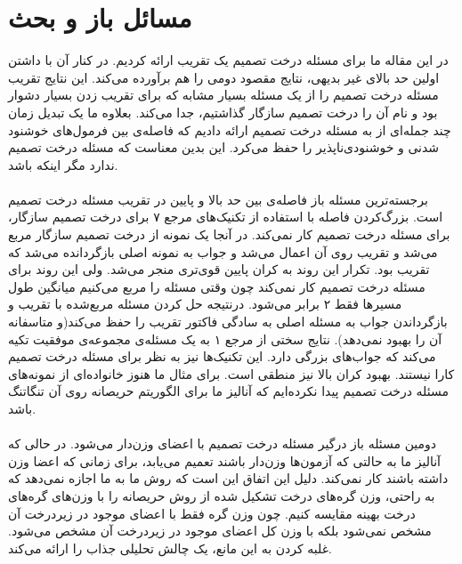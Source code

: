 \documentclass[a4paper]{article}
\begin{document}
 	\section{مسائل باز و بحث}
 	در این مقاله ما برای مسئله درخت تصمیم یک تقریب
 	ارائه کردیم. در کنار آن با داشتن اولین حد بالای غیر بدیهی، نتایج مقصود دومی را هم برآورده می‌کند. این نتایج
 	تقریب مسئله درخت تصمیم را از یک مسئله بسیار مشابه که برای تقریب زدن بسیار دشوار بود و نام آن را درخت تصمیم
 	سازگار گذاشتیم، جدا می‌کند. بعلاوه ما یک تبدیل زمان چند جمله‌ای از 
 	به مسئله درخت تصمیم ارائه دادیم که فاصله‌ی 
 	\lr{$\epsilon$}
 	بین فرمول‌های خوشنود شدنی و خوشنودی‌ناپذیر را حفظ می‌کرد. این بدین معناست که مسئله درخت تصمیم
 	ندارد مگر اینکه
 	باشد.
 	\paragraph{}
 	برجسته‌ترین مسئله باز فاصله‌ی بین حد بالا و پایین در تقریب مسئله درخت تصمیم است. بزرگ‌کردن فاصله با استفاده از
 	تکنیک‌های مرجع ۷ برای درخت تصمیم سازگار، برای مسئله درخت تصمیم کار نمی‌کند. در آنجا یک نمونه از
 	درخت تصمیم سازگار مربع می‌شد و تقریب
 	\lr{$\alpha$}
 	روی آن اعمال می‌شد و جواب به نمونه اصلی بازگردانده می‌شد که تقریب
 	\lr{$\sqrt{\alpha}$}
 	بود. تکرار این روند به کران پایین قوی‌تری منجر می‌شد. ولی این روند برای مسئله درخت تصمیم کار نمی‌کند چون وقتی 
 	مسئله را مربع می‌کنیم میانگین طول مسیرها فقط ۲ برابر می‌شود. درنتیجه حل کردن مسئله مربع‌شده با تقریب
 	\lr{$\alpha$}
 	و بازگرداندن جواب به مسئله اصلی به سادگی فاکتور تقریب را حفظ می‌کند(و متاسفانه آن را بهبود نمی‌دهد).
 	نتایج سختی از مرجع ۱ به یک مسئله‌ی مجموعه‌ی موفقیت تکیه می‌کند که جواب‌های بزرگی دارد. این تکنیک‌ها نیز به نظر برای مسئله درخت تصمیم کارا نیستند. بهبود کران بالا نیز منطقی است. برای مثال ما هنوز خانواده‌ای از نمونه‌های مسئله
 	درخت تصمیم پیدا نکرده‌ایم که آنالیز ما برای الگوریتم حریصانه روی آن تنگاتنگ باشد. 
 	\paragraph{}
 	دومین مسئله باز درگیر مسئله درخت تصمیم با اعضای وزن‌دار می‌شود. در حالی که آنالیز ما به حالتی که آزمون‌ها 
 	وزن‌دار باشند تعمیم می‌یابد، برای زمانی که اعضا وزن داشته باشند کار نمی‌کند.
 	دلیل این اتفاق این است که روش ما به ما اجازه نمی‌دهد که به راحتی، وزن گره‌های درخت تشکیل شده از روش حریصانه
 	را با وزن‌های گره‌های درخت بهینه مقایسه کنیم. چون وزن گره فقط با اعضای موجود در زیردرخت آن مشخص نمی‌شود بلکه
 	با وزن کل اعضای موجود در زیردرخت آن مشخص می‌شود. غلبه کردن به این مانع، یک چالش تحلیلی جذاب را ارائه می‌کند.
\end{document}
